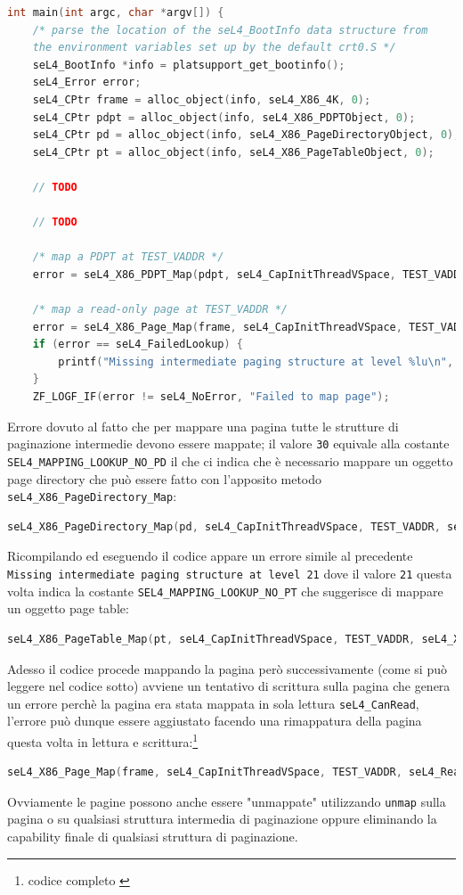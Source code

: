 \begin{lstlisting}[language=C++]
int main(int argc, char *argv[]) {
    /* parse the location of the seL4_BootInfo data structure from
    the environment variables set up by the default crt0.S */
    seL4_BootInfo *info = platsupport_get_bootinfo();
    seL4_Error error;
    seL4_CPtr frame = alloc_object(info, seL4_X86_4K, 0);
    seL4_CPtr pdpt = alloc_object(info, seL4_X86_PDPTObject, 0);
    seL4_CPtr pd = alloc_object(info, seL4_X86_PageDirectoryObject, 0);
    seL4_CPtr pt = alloc_object(info, seL4_X86_PageTableObject, 0);

	// TODO
	
	// TODO

    /* map a PDPT at TEST_VADDR */
    error = seL4_X86_PDPT_Map(pdpt, seL4_CapInitThreadVSpace, TEST_VADDR, seL4_X86_Default_VMAttributes);

    /* map a read-only page at TEST_VADDR */
    error = seL4_X86_Page_Map(frame, seL4_CapInitThreadVSpace, TEST_VADDR, seL4_CanRead, seL4_X86_Default_VMAttributes);
    if (error == seL4_FailedLookup) {
        printf("Missing intermediate paging structure at level %lu\n", seL4_MappingFailedLookupLevel());
    }
    ZF_LOGF_IF(error != seL4_NoError, "Failed to map page");
\end{lstlisting}
Errore dovuto al fatto che per mappare una pagina tutte le strutture di paginazione intermedie devono essere mappate; il valore \texttt{30} equivale alla costante \texttt{SEL4\_MAPPING\_LOOKUP\_NO\_PD} il che ci indica che è necessario mappare un oggetto page directory che può essere fatto con l'apposito metodo \texttt{seL4\_X86\_PageDirectory\_Map}:
\begin{lstlisting}[language=C++]
seL4_X86_PageDirectory_Map(pd, seL4_CapInitThreadVSpace, TEST_VADDR, seL4_X86_Default_VMAttributes);
\end{lstlisting}
Ricompilando ed eseguendo il codice appare un errore simile al precedente \texttt{Missing intermediate paging structure at level 21} dove il valore \texttt{21} questa volta indica la costante \texttt{SEL4\_MAPPING\_LOOKUP\_NO\_PT} che suggerisce di mappare un oggetto page table:
\begin{lstlisting}[language=C++]
seL4_X86_PageTable_Map(pt, seL4_CapInitThreadVSpace, TEST_VADDR, seL4_X86_Default_VMAttributes);
\end{lstlisting}
Adesso il codice procede mappando la pagina però successivamente (come si può leggere nel codice sotto) avviene un tentativo di scrittura sulla pagina che genera un errore perchè la pagina era stata mappata in sola lettura \texttt{seL4\_CanRead}, l'errore può dunque essere aggiustato facendo una rimappatura della pagina questa volta in lettura e scrittura:\footnote{codice completo \cite{mapping}}
\begin{lstlisting}[language=C++]
seL4_X86_Page_Map(frame, seL4_CapInitThreadVSpace, TEST_VADDR, seL4_ReadWrite, seL4_X86_Default_VMAttributes);
\end{lstlisting}
Ovviamente le pagine possono anche essere "unmappate" utilizzando \texttt{unmap} sulla pagina o su qualsiasi struttura intermedia di paginazione oppure eliminando la capability finale di qualsiasi struttura di paginazione.

